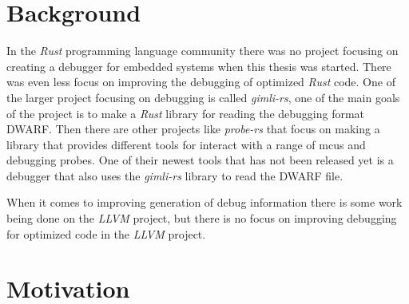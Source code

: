 \section{Background}
In the \emph{Rust} programming language community there was no project focusing on creating a debugger for embedded systems when this thesis was started.
There was even less focus on improving the debugging of optimized \emph{Rust} code.
One of the larger project focusing on debugging is called \emph{gimli-rs}, one of the main goals of the project is to make a \emph{Rust} library for reading the debugging format \gls{DWARF}.
Then there are other projects like \emph{probe-rs} that focus on making a library that provides different tools for interact with a range of \glspl{mcu} and debugging probes.
One of their newest tools that has not been released yet is a debugger that also uses the \emph{gimli-rs} library to read the \gls{DWARF} file.

When it comes to improving generation of debug information there is some work being done on the \emph{LLVM} project, but there is no focus on improving debugging for optimized code in the \emph{LLVM} project.


\section{Motivation}



